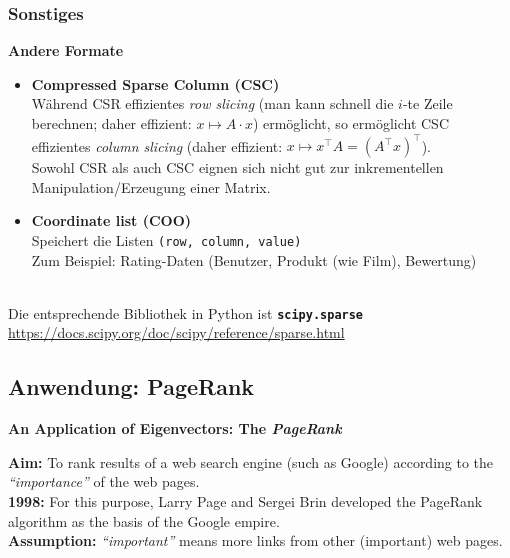 \subsubsection{Sonstiges}
\textbf{Andere Formate}
\begin{itemize}
	\item \textbf{Compressed Sparse Column (CSC)}\\
	Während CSR effizientes \textit{row slicing} (man kann schnell die $i$-te Zeile berechnen; daher effizient: $x \mapsto A\cdot x$) ermöglicht, so ermöglicht CSC effizientes \textit{column slicing} (daher effizient: $x \mapsto x^\top A = (A^\top x)^\top$).\\
	Sowohl CSR als auch CSC eignen sich nicht gut zur inkrementellen Manipulation/Erzeugung einer Matrix.
	\item \textbf{Coordinate list (COO)}\\
	Speichert die Listen \texttt{(row, column, value)}\\
	Zum Beispiel: Rating-Daten (Benutzer, Produkt (wie Film), Bewertung)
\end{itemize}
~\\
Die entsprechende Bibliothek in Python ist \textbf{\texttt{scipy.sparse}}\\
\url{https://docs.scipy.org/doc/scipy/reference/sparse.html}


\subsection{Anwendung: PageRank}
\textbf{An Application of Eigenvectors: The \textit{PageRank}}

\textbf{Aim:} To rank results of a web search engine (such as Google) according to the \textit{``importance''} of the web pages.\\

\textbf{1998:} For this purpose, Larry Page and Sergei Brin developed the PageRank algorithm as the basis of the
Google empire.\\

\textbf{Assumption:} \textit{``important''} means more links from other (important) web pages.\\


